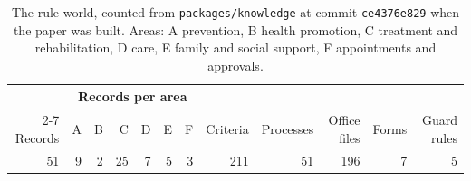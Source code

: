 \begin{table}[t]
\centering
\small
\caption{The rule world, counted from \texttt{packages/knowledge} at commit \texttt{ce4376e829} when the paper was built. Areas: A prevention, B health promotion, C treatment and rehabilitation, D care, E family and social support, F appointments and approvals.}
\label{tab:world}
\setlength{\tabcolsep}{4.5pt}
\begin{tabular}{rrrrrrrrrrrr}
\toprule
& \multicolumn{6}{c}{Records per area} & & & & & \\ \cmidrule(lr){2-7}
Records & A & B & C & D & E & F & Criteria & Processes & Office files & Forms & Guard rules \\
\midrule
51 & 9 & 2 & 25 & 7 & 5 & 3 & 211 & 51 & 196 & 7 & 5 \\
\bottomrule
\end{tabular}
\end{table}
